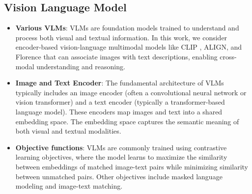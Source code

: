 \documentclass[11pt]{article}
\begin{document}
\subsection{Vision Language Model}
\begin{itemize}
    \item \textbf{Various VLMs}: VLMs are foundation models trained to understand and process both visual and textual information. In this work, we consider encoder-based vision-language multimodal models like CLIP \cite{clip}, ALIGN, and Florence that can associate images with text descriptions, enabling cross-modal understanding and reasoning. 
    
    \item \textbf{Image and Text Encoder}: The fundamental architecture of VLMs typically includes an image encoder (often a convolutional neural network or vision transformer) and a text encoder (typically a transformer-based language model). These encoders map images and text into a shared embedding space. The embedding space captures the semantic meaning of both visual and textual modalities.
    
    \item \textbf{Objective functions}: VLMs are commonly trained using contrastive learning objectives, where the model learns to maximize the similarity between embeddings of matched image-text pairs while minimizing similarity between unmatched pairs. Other objectives include masked language modeling and image-text matching.
    
    
\end{itemize}
\end{document}

